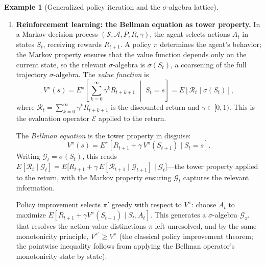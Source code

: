 \documentclass[12pt]{amsart}
\theoremstyle{definition}
\newtheorem{example}[theorem]{Example}
\theoremstyle{remark}
\begin{document}
\begin{example}[Generalized policy iteration and the $\sigma$-algebra lattice]
\begin{enumerate}[label=(\alph*)]
\item \textbf{Reinforcement learning: the Bellman equation as tower property.} In a Markov decision process $(\mathcal{S}, \mathcal{A}, P, R, \gamma)$, the agent selects actions $A_t$ in states $S_t$, receiving rewards $R_{t+1}$. A policy $\pi$ determines the agent's behavior; the Markov property ensures
that the value function depends only on the current state, so the relevant
$\sigma$-algebra is $\sigma(S_t)$, a coarsening of the full trajectory
$\sigma$-algebra. The \emph{value function} is
\[
V^\pi(s) = E^\pi\!\left[\sum_{k=0}^\infty \gamma^k R_{t+k+1} \;\middle|\; S_t = s\right] = E[\mathcal{R}_t \mid \sigma(S_t)],
\]
where $\mathcal{R}_t = \sum_{k=0}^\infty \gamma^k R_{t+k+1}$ is the discounted return and $\gamma \in [0,1)$. This is the evaluation operator $\mathcal{E}$ applied to the return.

The \emph{Bellman equation} is the tower property in disguise:
\begin{equation}\label{eq:bellman}
V^\pi(s) = E^\pi[R_{t+1} + \gamma\, V^\pi(S_{t+1}) \mid S_t = s].
\end{equation}
Writing $\mathcal{G}_t = \sigma(S_t)$, this reads $E[\mathcal{R}_t \mid \mathcal{G}_t] = E\bigl[R_{t+1} + \gamma\, E[\mathcal{R}_{t+1} \mid \mathcal{G}_{t+1}] \mid \mathcal{G}_t\bigr]$---the tower property applied to the return, with the Markov property ensuring $\mathcal{G}_t$ captures the relevant information.

Policy improvement selects $\pi'$ greedy with respect to $V^\pi$: choose $A_t$ to maximize $E[R_{t+1} + \gamma V^\pi(S_{t+1}) \mid S_t, A_t]$. This generates a $\sigma$-algebra $\mathcal{G}_{\pi'}$ that resolves the action-value distinctions $\pi$ left unresolved, and by the same monotonicity principle, $V^{\pi'} \geq V^\pi$
(the classical policy improvement theorem; the pointwise inequality
follows from applying the Bellman operator's monotonicity state by state).


\end{enumerate}
\end{example}
\end{document}
